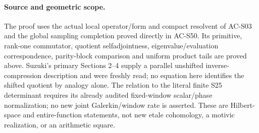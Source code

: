 \paragraph{Source and geometric scope.}
The proof uses the actual local operator/form and compact
resolvent of AC-S03 and the global sampling completion proved
directly in AC-S50.  Its primitive, rank-one commutator,
quotient selfadjointness, eigenvalue/evaluation correspondence,
parity-block comparison and uniform product tails are proved
above.  Suzuki's primary Sections 2--4 supply a parallel
unshifted inverse-compression description and were freshly read;
no equation here identifies the shifted quotient by analogy alone.
The relation to the literal finite S25 determinant requires its
already audited fixed-window scalar/phase normalization; no
new joint Galerkin/window rate is asserted.
These are Hilbert-space and entire-function statements, not
new etale cohomology, a motivic realization, or an arithmetic
square.
